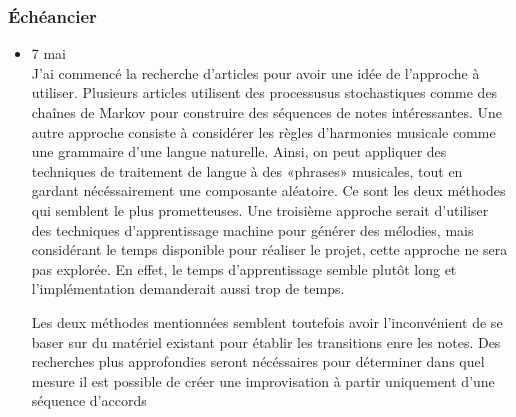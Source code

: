 \documentclass[letterpaper,12pt]{scrartcl}
\begin{document}
	\subsubsection{Échéancier}
	\begin{itemize}
	\item 7 mai	\\
	J'ai commencé la recherche d'articles pour avoir une idée de l'approche à utiliser. Plusieurs articles utilisent des processusus stochastiques comme des chaînes de Markov pour construire des séquences de notes intéressantes. Une autre approche consiste à considérer les règles d'harmonies musicale comme une grammaire d'une langue naturelle. Ainsi, on peut appliquer des techniques de traitement de langue à des «phrases» musicales, tout en gardant nécéssairement une composante aléatoire. Ce sont les deux méthodes qui semblent le plus prometteuses. Une troisième approche serait d'utiliser des techniques d'apprentissage machine pour générer des mélodies, mais considérant le temps disponible pour réaliser le projet, cette approche ne sera pas explorée. En effet, le temps d'apprentissage semble plutôt long et l'implémentation demanderait aussi trop de temps. 

Les deux méthodes mentionnées semblent toutefois avoir l'inconvénient de se baser sur du matériel existant pour établir les transitions enre les notes. Des recherches plus approfondies seront nécéssaires pour déterminer dans quel mesure il est possible de créer une improvisation à partir uniquement d'une séquence d'accords 


\end{itemize}
\end{document}
